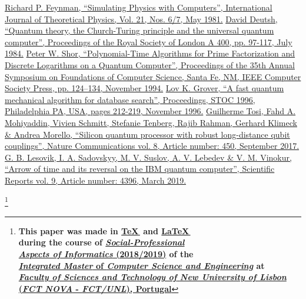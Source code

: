 \documentclass[conference]{IEEEtran}
\begin{document}
\begin{thebibliography}{00}

 \href{https://people.eecs.berkeley.edu/~christos/classics/Feynman.pdf}{Richard P. Feynman, ``Simulating Physics with Computers'', International Journal of Theoretical Physics, Vol. 21, Nos. 6/7, May 1981.}
 \href{https://people.eecs.berkeley.edu/~christos/classics/Deutsch_quantum_theory.pdf}{David Deutsh, ``Quantum theory, the Church-Turing principle and the universal quantum computer'', Proceedings of the Royal Society of London A 400, pp. 97-117, July 1984.}
 \href{https://arxiv.org/pdf/quant-ph/9508027.pdf}{Peter W. Shor, ``Polynomial-Time Algorithms for Prime Factorization
and Discrete Logarithms on a Quantum Computer'', Proceedings of the 35th Annual Symposium on Foundations of Computer Science, Santa Fe, NM, IEEE Computer Society Press, pp. 124–134, November 1994.}
 \href{https://arxiv.org/pdf/quant-ph/9605043.pdf}{Lov K. Grover, ``A fast quantum mechanical algorithm for database search'', Proceedings, STOC 1996, Philadelphia PA, USA, pages 212-219, November 1996.}
 \href{https://www.nature.com/articles/s41467-017-00378-x.pdf}{Guilherme Tosi, Fahd A. Mohiyaddin, Vivien Schmitt, Stefanie Tenberg, Rajib Rahman, Gerhard Klimeck \& Andrea Morello, ``Silicon quantum processor with robust long-distance qubit couplings'', Nature Communications vol. 8, Article number: 450, September 2017.}
 \href{https://www.nature.com/articles/s41598-019-40765-6.pdf}{G. B. Lesovik, I. A. Sadovskyy, M. V. Suslov, A. V. Lebedev \& V. M. Vinokur, ``Arrow of time and its reversal on the IBM quantum computer'', Scientific Reports vol. 9, Article number: 4396, March 2019.}

\end{thebibliography}

\vspace{10pt}

\begin{center}
    \thanks{
        \small{
            \textbf{This paper was made in \href{http://tug.org/}{\TeX\,} and \href{https://www.latex-project.org/}{\LaTeX\,} \\
            during the course of \href{https://sites.google.com/campus.fct.unl.pt/aspi-2019}{\textit{Social-Professional\\Aspects of Informatics} (2018/2019)} of the\\
            \href{https://www.fct.unl.pt/en/education/course/integrated-master-computer-science}{\textit{Integrated Master} of \textit{Computer Science and Engineering}} at \\
            \href{https://www.fct.unl.pt/}{\textit{Faculty of Sciences and Technology of}
            \textit{New University of Lisbon} 
            (\textit{FCT NOVA} - \textit{FCT/UNL}), Portugal}}}
        }
\end{center}
\end{document}
